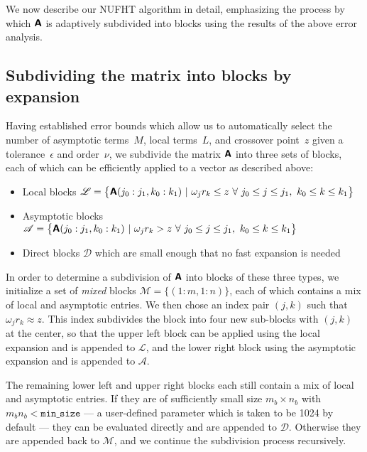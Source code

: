
We now describe our NUFHT algorithm in detail, emphasizing the process by which
$\bm{\mathsf{A}}$ is adaptively subdivided into blocks using the results of the above
error analysis.




\subsection{Subdividing the matrix into blocks by expansion}

Having established error bounds which allow us to automatically select the
number of asymptotic terms~$M$, local terms~$L$, and crossover point~$z$ given a
tolerance~$\epsilon$ and order~$\nu$, we subdivide the matrix $\bm{\mathsf{A}}$ into
three sets of blocks, each of which can be efficiently applied to a vector as
described above:
\begin{itemize}
    \item Local blocks $\mathscr{L} = \big\{ \bm{\mathsf{A}}(j_0:j_1, k_0:k_1) \ | \
    \omega_j r_k \leq z \ \forall \ j_0 \leq j \leq j_1, \ k_0 \leq k \leq k_1
    \big\}$
    \item Asymptotic blocks $\mathscr{A} = \big\{ \bm{\mathsf{A}}(j_0:j_1, k_0:k_1) \ |
    \ \omega_j r_k > z \ \forall \ j_0 \leq j \leq j_1, \ k_0 \leq k \leq k_1
    \big\}$
    \item Direct blocks $\mathscr{D}$ which are small enough that no fast
    expansion is needed
\end{itemize}


In order to determine a subdivision of $\bm{\mathsf{A}}$ into blocks of these three
types, we initialize a set of \textit{mixed} blocks $\mathscr{M} = \{(1:m,
1:n)\}$, each of which contains a mix of local and asymptotic entries. We then
chose an index pair $(j,k)$ such that $\omega_j r_k \approx z$. This index
subdivides the block into four new sub-blocks with $(j,k)$ at the center, so
that the upper left block can be applied using the local expansion and is
appended to $\mathscr{L}$, and the lower right block using the asymptotic
expansion and is appended to $\mathscr{A}$. 

The remaining lower left and upper right blocks each still contain a mix of
local and asymptotic entries. If they are of sufficiently small size $m_b \times
n_b$ with $m_b n_b < \texttt{min\_size}$ --- a user-defined parameter which is
taken to be 1024 by default --- they can be evaluated directly and are appended
to $\mathscr{D}$. Otherwise they are appended back to $\mathscr{M}$, and we
continue the subdivision process recursively. 

